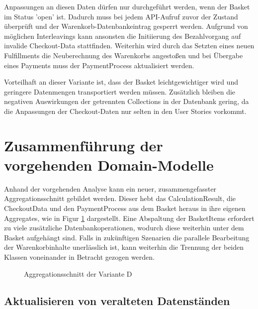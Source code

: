 Anpassungen an diesen Daten dürfen nur durchgeführt werden, wenn der Basket im Status 'open' ist. Dadurch muss bei jedem API-Aufruf zuvor der Zustand überprüft und der Warenkorb-Datenbankeintrag gesperrt werden. Aufgrund von möglichen Interleavings kann ansonsten die Initiierung des Bezahlvorgang auf invalide Checkout-Data stattfinden. Weiterhin wird durch das Setzten eines neuen Fulfillments die Neuberechnung des Warenkorbs angestoßen und bei Übergabe eines Payments muss der PaymentProcess aktualisiert werden.

Vorteilhaft an dieser Variante ist, dass der Basket leichtgewichtiger wird und geringere Datenmengen transportiert werden müssen. Zusätzlich bleiben die negativen Auswirkungen der getrennten Collections in der Datenbank gering, da die Anpassungen der Checkout-Daten nur selten in den User Stories vorkommt.

\section{Zusammenführung der vorgehenden Domain-Modelle}

Anhand der vorgehenden Analyse kann ein neuer, zusammengefasster Aggregationsschnitt gebildet werden.  Dieser hebt das CalculationResult, die CheckoutData und den PaymentProcess aus dem Basket heraus in ihre eigenen Aggregates, wie in Figur \ref{fig:VarD} dargestellt. Eine Abspaltung der BasketItems erfordert zu viele zusätzliche Datenbankoperationen, wodurch diese weiterhin unter dem Basket aufgehängt sind. Falls in zukünftigen Szenarien die parallele Bearbeitung der Warenkorbinhalte unerlässlich ist, kann weiterhin die Trennung der beiden Klassen voneinander in Betracht gezogen werden.  

\begin{figure}[htbp]
	\centering
	
	\caption{Aggregationsschnitt der Variante D}
	\label{fig:VarD}
\end{figure}

\subsection{Aktualisieren von veralteten Datenständen}

